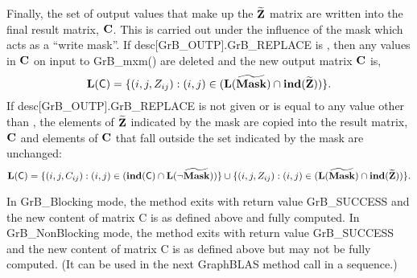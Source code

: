 Finally, the set of output values that make up the ${\bf \widetilde{Z}}$ matrix are written into the final result matrix, ${\bf C}$. 
This is carried out under the influence of the mask which acts as a ``write mask''.
If {\sf desc[GrB\_OUTP].GrB\_REPLACE} is \true, then any values in ${\bf C}$ on input to {\sf GrB\_mxm()} are deleted and the new
output matrix ${\bf C}$ is,
\[ \bold{L}({\sf C}) = \{(i,j,Z_{ij}) : (i,j) \in (\bold{L}({\bf \widetilde{Mask}}) \cap \bold{ind}({\bf \widetilde{Z}})) \}. \]
If {\sf desc[GrB\_OUTP].GrB\_REPLACE} is not given or is equal to any value other than \true, the elements of ${\bf \widetilde{Z}}$ indicated by the mask
are copied into the result matrix, ${\bf C}$ and elements of ${\bf C}$  that fall outside the set indicated by the mask are unchanged:
\[ \bold{L}({\sf C}) = \{(i,j,C_{ij}) : (i,j) \in (\bold{ind}({\bf \sf C}) \cap \bold{L}(\neg {\bf \widetilde{Mask}})) \} \cup \{(i,j,Z_{ij}) : (i,j) \in (\bold{L}({\bf \widetilde{Mask}}) \cap \bold{ind}({\bf \widetilde{Z}})) \}. \]

In {\sf GrB\_Blocking} mode, the method exits with return value {\sf GrB\_SUCCESS} and the new content of matrix {\sf C} is as defined above and fully computed.
In {\sf GrB\_NonBlocking} mode, the method exits with return value {\sf GrB\_SUCCESS} and the new content of matrix {\sf C} is as defined above but may not be fully computed. (It can be used in the next GraphBLAS method call in a sequence.)

